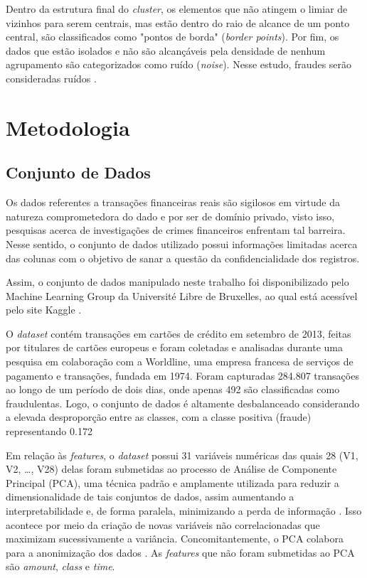 \documentclass{uflamon}          %
\begin{document}
Dentro da estrutura final do \textit{cluster}, os elementos que não atingem o limiar de vizinhos para serem centrais, mas estão dentro do raio de alcance de um ponto central, são classificados como "pontos de borda" (\textit{border points}). Por fim, os dados que estão isolados e não são alcançáveis pela densidade de nenhum agrupamento são categorizados como ruído (\textit{noise}). Nesse estudo, fraudes serão consideradas ruídos \cite{schubert2017}.


\chapter{Metodologia}

\section{Conjunto de Dados}

Os dados referentes a transações financeiras reais são sigilosos em virtude da natureza comprometedora do dado e por ser de domínio privado, visto isso, pesquisas acerca de investigações de crimes financeiros enfrentam tal barreira. Nesse sentido, o conjunto de dados utilizado possui informações limitadas acerca das colunas com o objetivo de sanar a questão da confidencialidade dos registros.

Assim, o conjunto de dados manipulado neste trabalho foi disponibilizado pelo Machine Learning Group da Université Libre de Bruxelles, ao qual está acessível pelo site Kaggle \cite{kaggle2018}.

O \textit{dataset} contém transações em cartões de crédito em setembro de 2013, feitas por titulares de cartões europeus e foram coletadas e analisadas durante uma pesquisa em colaboração com a Worldline, uma empresa francesa de serviços de pagamento e transações, fundada em 1974. Foram capturadas 284.807 transações ao longo de um período de dois dias, onde apenas 492 são classificadas como fraudulentas. Logo, o conjunto de dados é altamente desbalanceado considerando a elevada desproporção entre as classes, com a classe positiva (fraude) representando 0.172%

Em relação às \textit{features}, o \textit{dataset} possui 31 variáveis numéricas das quais 28 (V1, V2, \dots, V28) delas foram submetidas ao processo de Análise de Componente Principal (PCA), uma técnica padrão e amplamente utilizada para reduzir a dimensionalidade de tais conjuntos de dados, assim aumentando a interpretabilidade e, de forma paralela, minimizando a perda de informação \cite{abdi2010}. Isso acontece por meio da criação de novas variáveis não correlacionadas que maximizam sucessivamente a variância. Concomitantemente, o PCA colabora para a anonimização dos dados \cite{alarfaj2022}. As \textit{features} que não foram submetidas ao PCA são \textit{amount}, \textit{class} e \textit{time}.
\end{document}
